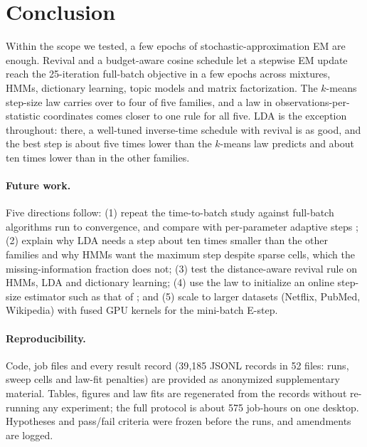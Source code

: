 \documentclass[10pt]{article}
\newcommand{\bibstylename}{tmlr}%
\newcommand{\bibstylename}{plainnat}%
\begin{document}
\section{Conclusion}

Within the scope we tested, a few epochs of stochastic-approximation EM are enough. Revival and a budget-aware cosine
schedule let a stepwise EM update reach the 25-iteration full-batch objective in a few epochs across mixtures, HMMs,
dictionary learning, topic models and matrix factorization. The $k$-means step-size law carries over to four of five
families, and a law in observations-per-statistic coordinates comes closer to one rule for all five. LDA is the
exception throughout: there, a well-tuned inverse-time schedule with revival is as good, and the best step is about
five times lower than the $k$-means law predicts and about ten times lower than in the other families.

\paragraph{Future work.} Five directions follow: (1) repeat the time-to-batch study against full-batch algorithms run
to convergence, and compare with per-parameter adaptive steps \citep{liu2025anemone}; (2) explain why LDA needs a step
about ten times smaller than the other families and why HMMs want the maximum step despite sparse cells, which the
missing-information fraction does not; (3) test the distance-aware revival rule on HMMs, LDA and dictionary learning;
(4) use the law to initialize an online step-size estimator such as that of \citet{ranganath2013adaptive}; and (5) scale
to larger datasets (Netflix, PubMed, Wikipedia) with fused GPU kernels for the mini-batch E-step.

\paragraph{Reproducibility.} Code, job files and every result record (39{,}185 JSONL records in 52 files: runs,
sweep cells and law-fit penalties) are provided as anonymized supplementary material. Tables, figures and law fits are regenerated from the records without
re-running any experiment; the full protocol is about 575 job-hours on one desktop. Hypotheses and pass/fail criteria
were frozen before the runs, and amendments are logged.




\appendix
\end{document}
